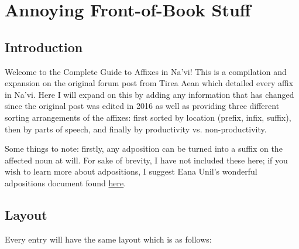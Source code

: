 \setcounter{chapter}{-1}
\chapter{Annoying Front-of-Book Stuff}
\section{Introduction}\par

Welcome to the Complete Guide to Affixes in Na'vi!  This is a compilation and expansion on the original forum post from Tirea Aean which detailed every affix in Na'vi.  Here I will expand on this by adding any information that has changed since the original post was edited in 2016 as well as providing three different sorting arrangements of the affixes: first sorted by location (prefix, infix, suffix), then by parts of speech, and finally by productivity vs. non-productivity.\par
Some things to note: firstly, any adposition can be turned into a suffix on the affected noun at will.  For sake of brevity, I have not included these here; if you wish to learn more about adpositions, I suggest Eana Unil's wonderful adpositions document found \href{https://docs.google.com/document/d/1uvwZGzPrphqev41y6YhMZ94orWbSPNhpRSxNbysFo80/edit}{here}. 

\section{Layout}\par
Every entry will have the same layout which is as follows:

